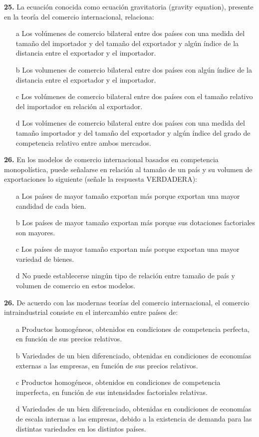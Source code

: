 \documentclass{nuevotema}
\begin{document}
\textbf{25.} La ecuación conocida como ecuación gravitatoria (gravity equation), presente en la teoría del comercio internacional, relaciona:
\begin{itemize}
	\item[a] Los volúmenes de comercio bilateral entre dos países con una medida del tamaño del importador y del tamaño del exportador y algún índice de la distancia entre el exportador y el importador.
	\item[b] Los volumenes de comercio bilateral entre dos países con algún índice de la distancia entre el exportador y el importador.
	\item[c] Los volúmenes de comercio bilateral entre dos países con el tamaño relativo del importador en relación al exportador.
	\item[d] Los volúmenes de comercio bilateral entre dos países con una medida del tamaño importador y del tamaño del exportador y algún índice del grado de competencia relativo entre ambos mercados.
\end{itemize}

\textbf{26.} En los modelos de comercio internacional basados en competencia monopolística, puede señalarse en relación al tamaño de un país y su volumen de exportaciones lo siguiente (señale la respuesta VERDADERA):
\begin{itemize}
	\item[a] Los países de mayor tamaño exportan más porque exportan una mayor candidad de cada bien.
	\item[b] Los países de mayor tamaño exportan más porque sus dotaciones factoriales son mayores.
	\item[c] Los países de mayor tamaño exportan más porque exportan una mayor variedad de bienes.
	\item[d] No puede establecerse ningún tipo de relación entre tamaño de país y volumen de comercio en estos modelos.
\end{itemize}

\textbf{26.} De acuerdo con las modernas teorías del comercio internacional, el comercio intraindustrial consiste en el intercambio entre países de:
\begin{itemize}
	\item[a] Productos homogéneos, obtenidos en condiciones de competencia perfecta, en función de sus precios relativos.
	\item[b] Variedades de un bien diferenciado, obtenidas en condiciones de economías externas a las empresas, en función de sus precios relativos.
	\item[c] Productos homogéneos, obtenidos en condiciones de competencia imperfecta, en función de sus intensidades factoriales relativas.
	\item[d] Variedades de un bien diferenciado, obtenidas en condiciones de economías de escala internas a las empresas, debido a la existencia de demanda para las distintas variedades en los distintos países.
\end{itemize}
\end{document}
